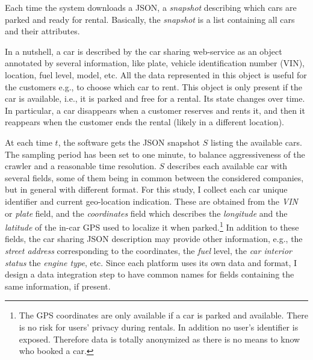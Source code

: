 Each time the system downloads a JSON, a \textit{snapshot} describing which cars are parked and ready for rental. Basically, the \textit{snapshot} is a list containing all cars and their attributes.

In a nutshell, a car is described by the car sharing web-service as an object annotated by several information, like plate, vehicle identification number (VIN), location, fuel level, model, etc. 
All the data represented in this object is useful for the customers e.g., to choose which car to rent.
This object is only present if the car is available, i.e., it is parked and free for a rental. Its state changes over time. In particular, a car disappears when a customer reserves and rents it, and then it reappears when the customer ends the rental (likely in a different location).


At each time $t$, the software gets the JSON snapshot $S$ listing the available cars. 
The sampling period has been set to one minute, to balance aggressiveness of the crawler and a reasonable time resolution.
$S$ describes each available car with several fields, some of them being in common between the considered companies, but in general with different format.
For this study, I collect each car unique identifier and current geo-location indication.
These are obtained from the \textit{VIN} or \textit{plate} field, and the \textit{coordinates} field which describes the \textit{longitude} and the \textit{latitude} of the in-car GPS used to localize it when  parked.\footnote{The GPS coordinates are only available if a car is parked and available. There is no risk for users' privacy during rentals. In addition no user's identifier is exposed. Therefore data is totally anonymized as there is no means to know who booked a car.}
In addition to these fields, the car sharing JSON description may provide other information, e.g., the \textit{street address} corresponding to the coordinates, the \textit{fuel} level, the \textit{car interior status} the \textit{engine type}, etc. Since each platform uses its own data and format, I design a data integration step to have common names for fields containing the same information, if present.

